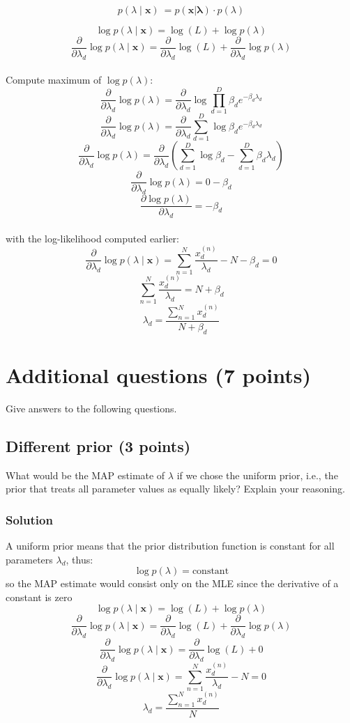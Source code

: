 \documentclass[a4paper,12pt]{article}
\begin{document}
\[
p(\lambda \mid \mathbf{x})\ = p(\mathbf{x} | \mathbf{\lambda}) \cdot p (\lambda)
\]

\[
\log p(\lambda \mid \mathbf{x}) = \log(L) + \log p(\lambda)
\]
\[
\frac{\partial}{\partial \lambda_d} \log p(\lambda \mid \mathbf{x}) = \frac{\partial}{\partial \lambda_d} \log(L) + \frac{\partial}{\partial \lambda_d} \log p(\lambda)
\]
\\
Compute maximum of $\log p(\lambda)$:
\[
\frac{\partial}{\partial \lambda_d} \log p(\lambda) = \frac{\partial}{\partial \lambda_d} \log \prod_{d=1}^D\beta_de^{-\beta_d \lambda_d}
\]
\[
\frac{\partial}{\partial \lambda_d} \log p(\lambda) = \frac{\partial}{\partial \lambda_d} \sum_{d=1}^D \log \beta_de^{-\beta_d \lambda_d}
\]
\[
\frac{\partial}{\partial \lambda_d} \log p(\lambda) = \frac{\partial}{\partial \lambda_d} ( \sum_{d=1}^D \log \beta_d - \sum_{d=1}^D \beta_d \lambda_d )
\]
\[
\frac{\partial}{\partial \lambda_d} \log p(\lambda) = 0 - \beta_d
\]
\[
\frac{\partial \log p(\lambda)}{\partial \lambda_d} = -\beta_d
\]
\\
with the log-likelihood computed earlier:
\[
\frac{\partial}{\partial \lambda_d} \log p(\lambda \mid \mathbf{x}) = \sum_{n=1}^{N} \frac{x_d^{(n)}}{\lambda_d} - N -\beta_d = 0
\]
\[
 \sum_{n=1}^{N} \frac{x_d^{(n)}}{\lambda_d} = N +\beta_d
\]
\[
\lambda_d = \frac{\sum_{n=1}^{N} x_d^{(n)}}{N +\beta_d}
\]

\newpage
\section{Additional questions (7 points)}
Give answers to the following questions.

\subsection{Different prior (3 points)}
What would be the MAP estimate of $\lambda$ if we chose the uniform prior, i.e., the prior that treats all parameter values as equally likely? Explain your reasoning.

\subsubsection{Solution}
A uniform prior means that the prior distribution function is constant for all parameters $\lambda_d$, thus:
\[
\log p(\lambda) = \text{constant}
\]
so the MAP estimate would consist only on the MLE since the derivative of a constant is zero
\[
\log p(\lambda \mid \mathbf{x}) = \log(L) + \log p(\lambda)
\]
\[
\frac{\partial}{\partial \lambda_d} \log p(\lambda \mid \mathbf{x}) = \frac{\partial}{\partial \lambda_d} \log(L) + \frac{\partial}{\partial \lambda_d} \log p(\lambda)
\]
\[
\frac{\partial}{\partial \lambda_d} \log p(\lambda \mid \mathbf{x}) = \frac{\partial}{\partial \lambda_d} \log(L) + 0
\]
\[
\frac{\partial}{\partial \lambda_d} \log p(\lambda \mid \mathbf{x}) = 
\sum_{n=1}^{N} \frac{x_d^{(n)}}{\lambda_d} - N = 0
\]
\[
\lambda_d = \frac{\sum_{n=1}^{N} x_d^{(n)}}{N}
\]
\end{document}
